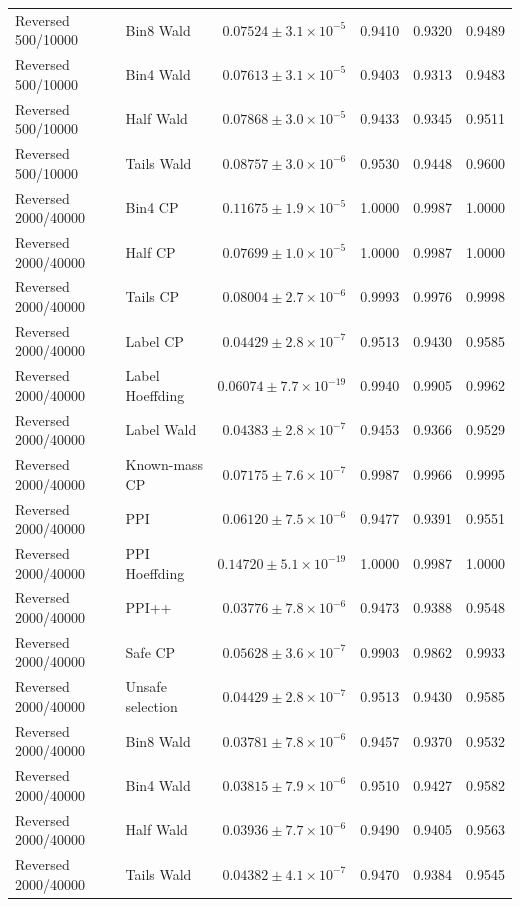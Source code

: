 \begin{longtable}{llrrrr}
Reversed 500/10000 & Bin8 Wald & $0.07524\pm 3.1\times 10^{-5}$ & 0.9410 & 0.9320 & 0.9489 \\
Reversed 500/10000 & Bin4 Wald & $0.07613\pm 3.1\times 10^{-5}$ & 0.9403 & 0.9313 & 0.9483 \\
Reversed 500/10000 & Half Wald & $0.07868\pm 3.0\times 10^{-5}$ & 0.9433 & 0.9345 & 0.9511 \\
Reversed 500/10000 & Tails Wald & $0.08757\pm 3.0\times 10^{-6}$ & 0.9530 & 0.9448 & 0.9600 \\
Reversed 2000/40000 & Bin4 CP & $0.11675\pm 1.9\times 10^{-5}$ & 1.0000 & 0.9987 & 1.0000 \\
Reversed 2000/40000 & Half CP & $0.07699\pm 1.0\times 10^{-5}$ & 1.0000 & 0.9987 & 1.0000 \\
Reversed 2000/40000 & Tails CP & $0.08004\pm 2.7\times 10^{-6}$ & 0.9993 & 0.9976 & 0.9998 \\
Reversed 2000/40000 & Label CP & $0.04429\pm 2.8\times 10^{-7}$ & 0.9513 & 0.9430 & 0.9585 \\
Reversed 2000/40000 & Label Hoeffding & $0.06074\pm 7.7\times 10^{-19}$ & 0.9940 & 0.9905 & 0.9962 \\
Reversed 2000/40000 & Label Wald & $0.04383\pm 2.8\times 10^{-7}$ & 0.9453 & 0.9366 & 0.9529 \\
Reversed 2000/40000 & Known-mass CP & $0.07175\pm 7.6\times 10^{-7}$ & 0.9987 & 0.9966 & 0.9995 \\
Reversed 2000/40000 & PPI & $0.06120\pm 7.5\times 10^{-6}$ & 0.9477 & 0.9391 & 0.9551 \\
Reversed 2000/40000 & PPI Hoeffding & $0.14720\pm 5.1\times 10^{-19}$ & 1.0000 & 0.9987 & 1.0000 \\
Reversed 2000/40000 & PPI++ & $0.03776\pm 7.8\times 10^{-6}$ & 0.9473 & 0.9388 & 0.9548 \\
Reversed 2000/40000 & Safe CP & $0.05628\pm 3.6\times 10^{-7}$ & 0.9903 & 0.9862 & 0.9933 \\
Reversed 2000/40000 & Unsafe selection & $0.04429\pm 2.8\times 10^{-7}$ & 0.9513 & 0.9430 & 0.9585 \\
Reversed 2000/40000 & Bin8 Wald & $0.03781\pm 7.8\times 10^{-6}$ & 0.9457 & 0.9370 & 0.9532 \\
Reversed 2000/40000 & Bin4 Wald & $0.03815\pm 7.9\times 10^{-6}$ & 0.9510 & 0.9427 & 0.9582 \\
Reversed 2000/40000 & Half Wald & $0.03936\pm 7.7\times 10^{-6}$ & 0.9490 & 0.9405 & 0.9563 \\
Reversed 2000/40000 & Tails Wald & $0.04382\pm 4.1\times 10^{-7}$ & 0.9470 & 0.9384 & 0.9545 \\

\end{longtable}
